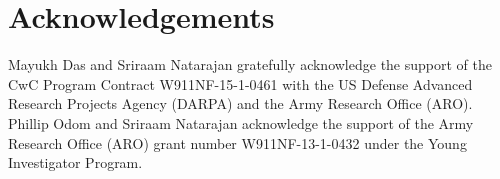 \documentclass[sigconf]{acmart}
\begin{document}
\section*{Acknowledgements}
Mayukh Das and Sriraam Natarajan gratefully acknowledge the support of the CwC Program Contract W911NF-15-1-0461 with the US Defense Advanced Research Projects Agency (DARPA) and the Army Research Office (ARO).
Phillip Odom and Sriraam Natarajan acknowledge the support of the Army Research Office (ARO) grant number W911NF-13-1-0432 under the Young Investigator Program.

%


\end{document}
